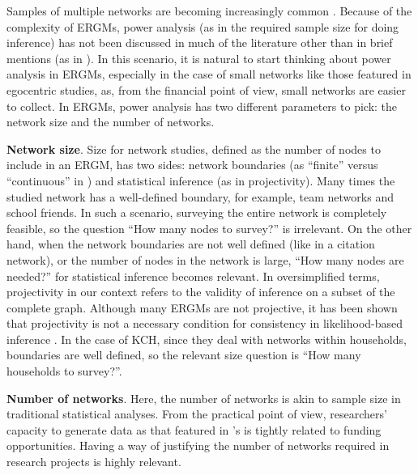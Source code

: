 \documentclass[12pt]{article}
\begin{document}
Samples of multiple networks are becoming increasingly common \citep{yonExponentialRandomGraph2021,krivitskyTaleTwoDatasets2022, duxburyScalingBiasPooled2023}. Because of the complexity of ERGMs, power analysis (as in the required sample size for doing inference) has not been discussed in much of the literature other than in brief mentions (as in \cite{yonExponentialRandomGraph2021}). In this scenario, it is natural to start thinking about power analysis in ERGMs, especially in the case of small networks like those featured in egocentric studies, as, from the financial point of view, small networks are easier to collect. In ERGMs, power analysis has two different parameters to pick: the network size and the number of networks. 

\bigskip

\noindent \textbf{Network size}. Size for network studies, defined as the number of nodes to include in an ERGM, has two sides: network boundaries (as ``finite'' versus ``continuous'' in \cite{buttsRevisitingFoundationsNetwork2009}) and statistical inference (as in projectivity). Many times the studied network has a well-defined boundary, for example, team networks and school friends. In such a scenario, surveying the entire network is completely feasible, so the question ``How many nodes to survey?'' is irrelevant. On the other hand, when the network boundaries are not well defined (like in a citation network), or the number of nodes in the network is large, ``How many nodes are needed?'' for statistical inference becomes relevant. In oversimplified terms, projectivity in our context refers to the validity of inference on a subset of the complete graph. Although many ERGMs are not projective, it has been shown that projectivity is not a necessary condition for consistency in likelihood-based inference \citep{schweinbergerNoteRoleProjectivity2017, schweinbergerExponentialFamilyModelsRandom2020}. In the case of KCH, since they deal with networks within households, boundaries are well defined, so the relevant size question is ``How many households to survey?''.
 
\bigskip

\noindent\textbf{Number of networks}. Here, the number of networks is akin to sample size in traditional statistical analyses. From the practical point of view, researchers' capacity to generate data as that featured in \citeauthor*{krivitskyTaleTwoDatasets2022}'s is tightly related to funding opportunities. Having a way of justifying the number of networks required in research projects is highly relevant.
\end{document}
